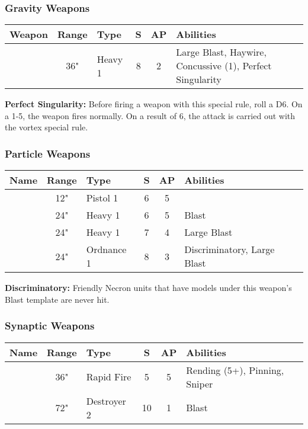 \subsubsection{Gravity Weapons}

\label{Singulatiry Generator}
\begin{NiceTabular}{L{115 pt} c C{40pt} *{2}{c} >{\raggedright\arraybackslash}p{240pt}}
	Weapon & Range & Type & S & AP & Abilities \\
	\hline
	 & 36" & Heavy 1 & 8 & 2 & Large Blast, Haywire, Concussive (1), Perfect Singularity  \\
\end{NiceTabular}

\vspace*{1em}
\textbf{Perfect Singularity:} Before firing a weapon with this special rule, roll a D6. On a 1-5, the weapon fires normally. On a result of 6, the attack is carried out with the vortex special rule.

\subsubsection{Particle Weapons}

\label{Particle Caster} \label{Particle Beamer} \label{Particle Shredder} \label{Particle Whip}
\noindent
\begin{NiceTabular}{L{115 pt} c C{40pt} *{2}{c} >{\raggedright\arraybackslash}p{240pt}}
	Name & Range & Type & S & AP & Abilities \\
	\hline
	 & 12" & Pistol 1 & 6 & 5 & \\
	  & 24" & Heavy 1 & 6 & 5 & Blast \\
	 & 24" & Heavy 1 & 7 & 4 & Large Blast \\
	  & 24" & Ordnance 1 & 8 & 3 & Discriminatory, Large Blast \\
\end{NiceTabular}

\vspace*{1em}
\textbf{Discriminatory:} Friendly Necron units that have models under this weapon's Blast template are never hit.


\subsubsection{Synaptic Weapons}
\label{Synaptic Disintegrator}
\noindent
\begin{NiceTabular}{L{115 pt} c C{40pt} *{2}{c} >{\raggedright\arraybackslash}p{240pt}}
	Name & Range & Type & S & AP & Abilities \\
	\hline
	 & 36" & Rapid Fire & 5 & 5 & Rending (5+), Pinning, Sniper \\	
	  & 72" & Destroyer 2 & 10 & 1 & Blast \\
\end{NiceTabular}

